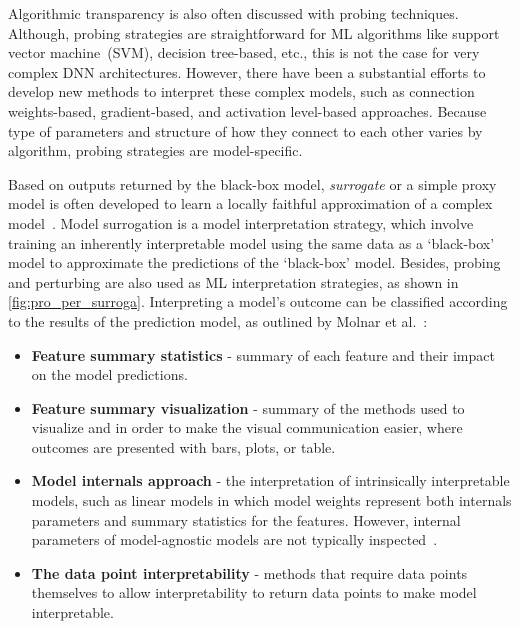 
\hspace*{3.5mm} Algorithmic transparency is also often discussed with probing techniques. Although, probing strategies are straightforward for ML algorithms like support vector machine~(SVM), decision tree-based, etc., this is not the case for very complex DNN architectures. However, there have been a substantial efforts to develop new methods to interpret these complex models, such as connection weights-based, gradient-based, and activation level-based approaches. Because type of parameters and structure of how they connect to each other varies by algorithm, probing strategies are
model-specific.

\hspace*{3.5mm} Based on outputs returned by the black-box model, \textit{surrogate} or a simple proxy model is often developed to learn a locally faithful approximation of a complex model~\cite{stiglic2020interpretability}. Model surrogation is a model interpretation strategy, which involve training an inherently interpretable model using the same data as a `black-box' model to approximate the predictions of the `black-box' model. Besides, probing and perturbing are also used as ML interpretation strategies, as shown in \cref{fig:pro_per_surroga}. Interpreting a model's outcome can be classified according to the results of the prediction model, as outlined by Molnar et al.~\cite{molnar2019interpretable}:

\begin{itemize}[noitemsep]
    \item \textbf{Feature summary statistics} - summary of each feature and their impact on the model predictions. 
    \item \textbf{Feature summary visualization} - summary of the methods used to visualize and in order to make the visual communication easier, where outcomes are  presented with bars, plots, or table. 
    \item \textbf{Model internals approach} - the interpretation of intrinsically interpretable models, such as linear models in which model weights represent both internals parameters and summary statistics for the features. However, internal parameters of model-agnostic models are not typically inspected~\cite{molnar2019interpretable}. 
    \item \textbf{The data point interpretability} - methods that require data points themselves to allow interpretability to  return data points to make model interpretable. 
\end{itemize}

